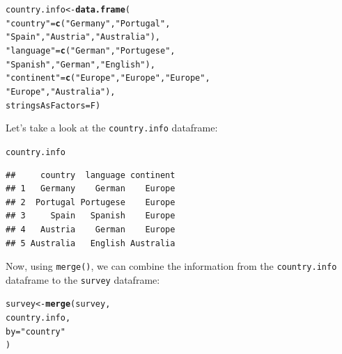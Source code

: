 \documentclass{tufte-book}\usepackage[]{graphicx}\usepackage[]{color}
\makeatletter
\newcommand{\hlstr}[1]{\textcolor[rgb]{0.192,0.494,0.8}{#1}}%
\newcommand{\hlstd}[1]{\textcolor[rgb]{0.345,0.345,0.345}{#1}}%
\newcommand{\hlkwb}[1]{\textcolor[rgb]{0.69,0.353,0.396}{#1}}%
\newcommand{\hlkwc}[1]{\textcolor[rgb]{0.333,0.667,0.333}{#1}}%
\newcommand{\hlkwd}[1]{\textcolor[rgb]{0.737,0.353,0.396}{\textbf{#1}}}%
\newenvironment{kframe}{%
 \def\at@end@of@kframe{}%
 \ifinner\ifhmode%
  \def\at@end@of@kframe{\end{minipage}}%
  \begin{minipage}{\columnwidth}%
 \fi\fi%
 \def\FrameCommand##1{\hskip\@totalleftmargin \hskip-\fboxsep
 \colorbox{shadecolor}{##1}\hskip-\fboxsep
     \hskip-\linewidth \hskip-\@totalleftmargin \hskip\columnwidth}%
 \MakeFramed {\advance\hsize-\width
   \@totalleftmargin\z@ \linewidth\hsize
   \@setminipage}}%
 {\par\unskip\endMakeFramed%
 \at@end@of@kframe}
\newenvironment{knitrout}{}{} %
\makeatother
\begin{document}
\begin{marginfigure}
\begin{knitrout}
\color{fgcolor}\begin{kframe}
\begin{alltt}
\hlstd{country.info} \hlkwb{<-} \hlkwd{data.frame}\hlstd{(}
\hlstr{"country"} \hlstd{=} \hlkwd{c}\hlstd{(}\hlstr{"Germany"}\hlstd{,} \hlstr{"Portugal"}\hlstd{,}
              \hlstr{"Spain"}\hlstd{,} \hlstr{"Austria"}\hlstd{,} \hlstr{"Australia"}\hlstd{),}
\hlstr{"language"} \hlstd{=} \hlkwd{c}\hlstd{(}\hlstr{"German"}\hlstd{,} \hlstr{"Portugese"}\hlstd{,}
               \hlstr{"Spanish"}\hlstd{,} \hlstr{"German"}\hlstd{,} \hlstr{"English"}\hlstd{),}
\hlstr{"continent"} \hlstd{=} \hlkwd{c}\hlstd{(}\hlstr{"Europe"}\hlstd{,} \hlstr{"Europe"}\hlstd{,} \hlstr{"Europe"}\hlstd{,}
                \hlstr{"Europe"}\hlstd{,} \hlstr{"Australia"}\hlstd{),}
\hlkwc{stringsAsFactors} \hlstd{= F)}
\end{alltt}
\end{kframe}
\end{knitrout}
\end{marginfigure}

Let's take a look at the \texttt{country.info} dataframe:

\begin{footnotesize}
\begin{knitrout}
\color{fgcolor}\begin{kframe}
\begin{alltt}
\hlstd{country.info}
\end{alltt}
\begin{verbatim}
##     country  language continent
## 1   Germany    German    Europe
## 2  Portugal Portugese    Europe
## 3     Spain   Spanish    Europe
## 4   Austria    German    Europe
## 5 Australia   English Australia
\end{verbatim}
\end{kframe}
\end{knitrout}
\end{footnotesize}

Now, using \texttt{merge()}, we can combine the information from the \texttt{country.info} dataframe to the \texttt{survey} dataframe:

\begin{knitrout}
\color{fgcolor}\begin{kframe}
\begin{alltt}
\hlstd{survey} \hlkwb{<-} \hlkwd{merge}\hlstd{(survey,}
                \hlstd{country.info,}
                \hlkwc{by} \hlstd{=} \hlstr{"country"}
                \hlstd{)}
\end{alltt}
\end{kframe}
\end{knitrout}
\end{document}
